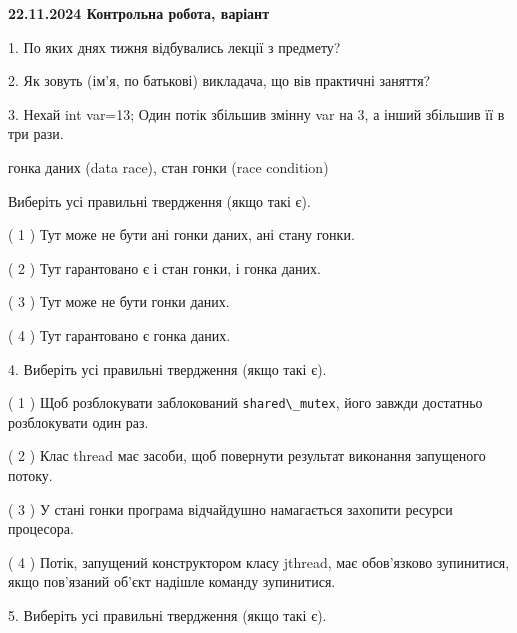 \documentclass[12pt, ukrainian]{article}
\def\code#1{\Verb!#1!}
\begin{document}
\vspace{4mm}
\newpage
\begin {large}

\textbf{22.11.2024 Контрольна робота, варіант  }\par


{
1. По яких днях тижня відбувались лекції з предмету?



\vspace{5mm}
2. Як зовуть (ім'я, по батькові) викладача, що вів практичні заняття?



\vspace{5mm}
3. Нехай int var=13; Один потік збільшив змінну var на 3, а інший збільшив її в три рази.

гонка даних (data race), стан гонки (race condition)

Виберіть усі правильні твердження (якщо такі є).\par
\vspace{2mm}
( 1 ) Тут може не бути ані гонки даних, ані стану гонки.%

( 2 ) Тут гарантовано є і стан гонки, і гонка даних.%

( 3 ) Тут може не бути гонки даних.%

( 4 ) Тут гарантовано є гонка даних.%


\vspace{5mm}
4. Виберіть усі правильні твердження (якщо такі є).\par
\vspace{2mm}

( 1 ) Щоб розблокувати заблокований \code{shared\_mutex}, його завжди достатньо розблокувати один раз.%

( 2 ) Клас thread має засоби, щоб повернути результат виконання запущеного потоку.%

( 3 ) У стані гонки програма відчайдушно намагається захопити ресурси процесора.%

( 4 ) Потік, запущений конструктором класу jthread, має обов’язково зупинитися, якщо пов’язаний об’єкт надішле команду зупинитися.%


\vspace{5mm}
5. Виберіть усі правильні твердження (якщо такі є).\par
\vspace{2mm}

}
\end{large}
\end{document}
